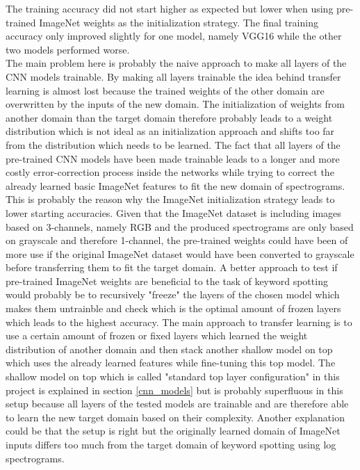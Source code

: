 \documentclass{article}
\theoremstyle{definition}
\theoremstyle{remark}
\begin{document}
The training accuracy did not start higher as expected but lower when using pre-trained ImageNet weights as the initialization strategy. The final training accuracy only improved slightly for one model, namely VGG16 while the other two models performed worse.\\
The main problem here is probably the naive approach to make all layers of the CNN models trainable. By making all layers trainable the idea behind transfer learning is almost lost because the trained weights of the other domain are overwritten by the inputs of the new domain. The initialization of weights from another domain than the target domain therefore probably leads to a weight distribution which is not ideal as an initialization approach and shifts too far from the distribution which needs to be learned.
The fact that all layers of the pre-trained CNN models have been made trainable leads to a longer and more costly error-correction process inside the networks while trying to correct the already learned basic ImageNet features to fit the new domain of spectrograms. This is probably the reason why the ImageNet initialization strategy leads to lower starting accuracies. Given that the ImageNet dataset is including images based on 3-channels, namely RGB and the produced spectrograms are only based on grayscale and therefore 1-channel, the pre-trained weights could have been of more use if the original ImageNet dataset would have been converted to grayscale before transferring them to fit the target domain. A better approach to test if pre-trained ImageNet weights are beneficial to the task of keyword spotting would probably be to recursively "freeze" the layers of the chosen model which makes them untrainble and check which is the optimal amount of frozen layers which leads to the highest accuracy. The main approach to transfer learning is to use a certain amount of frozen or fixed layers which learned the weight distribution of another domain and then stack another shallow model on top which uses the already learned features while fine-tuning this top model. The shallow model on top which is called "standard top layer configuration" in this project is explained in section \ref{cnn_models} but is probably superfluous in this setup because all layers of the tested models are trainable and are therefore able to learn the new target domain based on their complexity. Another explanation could be that the setup is right but the originally learned domain of ImageNet inputs differs too much from the target domain of keyword spotting using log spectrograms.\\
\end{document}
